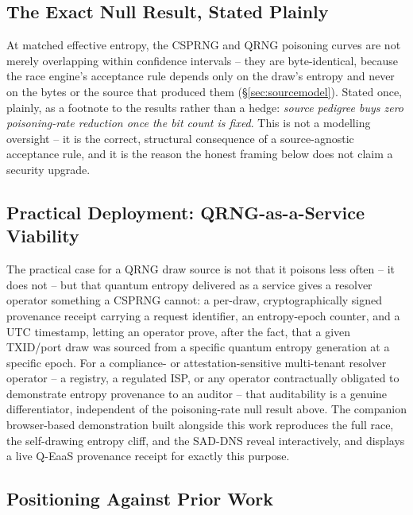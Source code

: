 \documentclass[conference]{IEEEtran}
\begin{document}
\subsection{The Exact Null Result, Stated Plainly}

At matched effective entropy, the CSPRNG and QRNG poisoning curves are not merely overlapping within
confidence intervals -- they are byte-identical, because the race engine's acceptance rule depends only on
the draw's entropy and never on the bytes or the source that produced them (\S\ref{sec:sourcemodel}).
Stated once, plainly, as a footnote to the results rather than a hedge: \emph{source pedigree buys zero
poisoning-rate reduction once the bit count is fixed}. This is not a modelling oversight -- it is the
correct, structural consequence of a source-agnostic acceptance rule, and it is the reason the honest
framing below does not claim a security upgrade.

\subsection{Practical Deployment: QRNG-as-a-Service Viability}
\label{sec:qrngdeployment}

The practical case for a QRNG draw source is not that it poisons less often -- it does not -- but that
quantum entropy delivered as a service gives a resolver operator something a CSPRNG cannot: a per-draw,
cryptographically signed provenance receipt carrying a request identifier, an entropy-epoch counter, and a
UTC timestamp, letting an operator prove, after the fact, that a given TXID/port draw was sourced from a
specific quantum entropy generation at a specific epoch. For a compliance- or attestation-sensitive
multi-tenant resolver operator -- a registry, a regulated ISP, or any operator contractually obligated to
demonstrate entropy provenance to an auditor -- that auditability is a genuine differentiator, independent
of the poisoning-rate null result above. The companion browser-based demonstration built alongside this
work reproduces the full race, the self-drawing entropy cliff, and the SAD-DNS reveal interactively, and
displays a live Q-EaaS provenance receipt for exactly this purpose.

\subsection{Positioning Against Prior Work}
\end{document}
